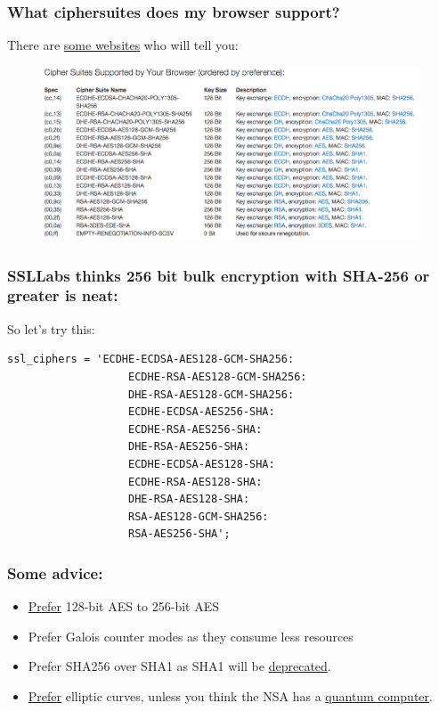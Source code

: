 \documentclass[9pt]{beamer}
\begin{document}
\begin{frame}
\frametitle{What ciphersuites does my browser support?}
There are \href{https://cc.dcsec.uni-hannover.de/}{some websites} who will tell you:
\begin{figure}
\includegraphics[scale=0.25]{figures/browserciphersuites.png}
\end{figure}
\end{frame}

\begin{frame}[fragile]
\frametitle{SSLLabs thinks 256 bit bulk encryption with SHA-256 or greater is neat:}
So let's try this:
\begin{verbatim}
ssl_ciphers = 'ECDHE-ECDSA-AES128-GCM-SHA256:
                   ECDHE-RSA-AES128-GCM-SHA256:
                   DHE-RSA-AES128-GCM-SHA256:
                   ECDHE-ECDSA-AES256-SHA:
                   ECDHE-RSA-AES256-SHA:
                   DHE-RSA-AES256-SHA:
                   ECDHE-ECDSA-AES128-SHA:
                   ECDHE-RSA-AES128-SHA:
                   DHE-RSA-AES128-SHA:
                   RSA-AES128-GCM-SHA256:
                   RSA-AES256-SHA';   
\end{verbatim}
\end{frame}

\begin{frame}[fragile]
\frametitle{Some advice:}
\begin{itemize}
\item \href{https://www.schneier.com/blog/archives/2009/07/another_new_aes.html}{Prefer} 128-bit AES to 256-bit AES
\item Prefer Galois counter modes as they consume less resources
\item Prefer SHA256 over SHA1 as SHA1 will be \href{http://googleonlinesecurity.blogspot.com/2014/09/gradually-sunsetting-sha-1.html}{deprecated}.
\item \href{https://www.nsa.gov/business/programs/elliptic_curve.shtml}{Prefer} elliptic curves, unless you think the NSA has a \href{https://en.wikipedia.org/wiki/Elliptic_curve_cryptography}{quantum computer}.
\end{itemize}
\end{frame}
\end{document}
